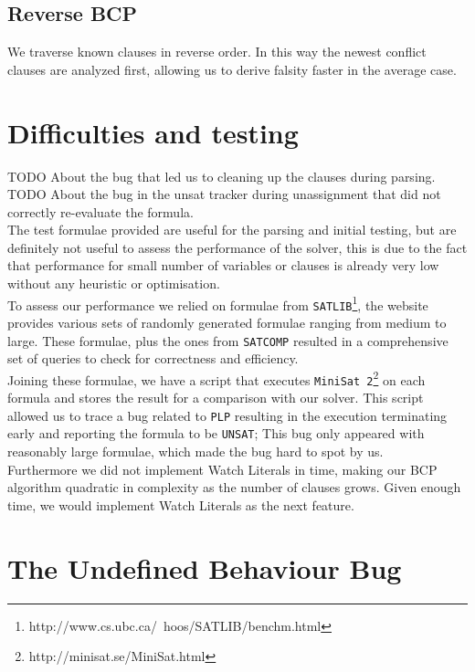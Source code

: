 \documentclass[a4paper]{article}
\begin{document}
\subsection{Reverse BCP}

We traverse known clauses in reverse order. In this way the newest conflict clauses are analyzed first, allowing us to derive falsity faster in the average case.

\section{Difficulties and testing}

TODO About the bug that led us to cleaning up the clauses during parsing.\\
TODO About the bug in the unsat tracker during unassignment that did not correctly re-evaluate the formula.\\
The test formulae provided are useful for the parsing and initial testing, but are definitely not useful to assess the performance of the solver, this is due to the fact that performance for small number of variables or clauses is already very low without any heuristic or optimisation. \\
To assess our performance we relied on formulae from \texttt{SATLIB}\footnote{http://www.cs.ubc.ca/~hoos/SATLIB/benchm.html}, the website provides various sets of randomly generated formulae ranging from medium to large.
These formulae, plus the ones from \texttt{SATCOMP} resulted in a comprehensive set of queries to check for correctness and efficiency. \\
Joining these formulae, we have a script that executes \texttt{MiniSat 2}\footnote{http://minisat.se/MiniSat.html} on each formula and stores the result for a comparison with our solver.
This script allowed us to trace a bug related to \texttt{PLP} resulting in the execution terminating early and reporting the formula to be \texttt{UNSAT}; This bug only appeared with reasonably large formulae, which made the bug hard to spot by us. \\
Furthermore we did not implement Watch Literals in time, making our BCP algorithm quadratic in complexity as the number of clauses grows. Given enough time, we would implement Watch Literals as the next feature.\\


\section{The Undefined Behaviour Bug}
\end{document}
